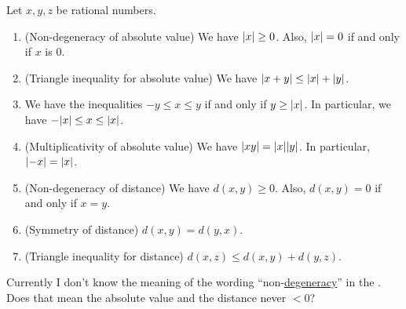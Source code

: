 \begin{proposition}  \label{prop 4.3.3}
Let \(x, y, z\) be rational numbers.
\begin{enumerate}
    \item {} (Non-degeneracy of absolute value)
        We have \(\lvert x\rvert \ge 0\).
        Also, \(\lvert x\rvert = 0\) if and only if \(x\) is \(0\).
    \item {} (Triangle inequality for absolute value)
        We have \(\lvert x + y\rvert \le \lvert x\rvert + \lvert y\rvert\).
    \item {}
        We have the inequalities \(-y \le x \le y\) if and only if \(y \ge \lvert x\rvert\).
        In particular, we have \(-\lvert x\rvert \le x \le \lvert x\rvert\).
    \item {} (Multiplicativity of absolute value)
        We have \(\lvert xy\rvert = \lvert x\rvert\lvert y\rvert\).
        In particular, \(\lvert-x\rvert = \lvert x\rvert\).
    \item {} (Non-degeneracy of distance)
        We have \(d(x, y) \ge 0\).
        Also, \(d(x, y) = 0\) if and only if \(x = y\).
    \item {} (Symmetry of distance)
        \(d(x, y)= d(y, x)\).
    \item {} (Triangle inequality for distance)
        \(d(x, z) \le d(x, y) + d(y, z)\).
\end{enumerate}
\end{proposition}

\begin{note}
Currently I don't know the meaning of the wording ``non-\href{https://www.wikiwand.com/en/Degeneracy_(mathematics)}{degeneracy}'' in the . Does that mean the absolute value and the distance never \(< 0\)?
\end{note}

